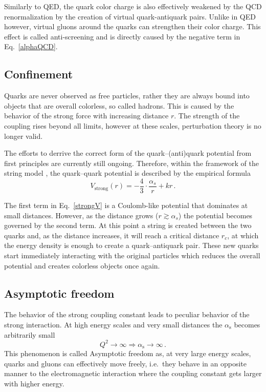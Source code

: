 Similarly to QED, the quark color charge is also effectively weakened by the QCD renormalization by the creation of virtual quark-antiquark pairs. Unlike in QED however, virtual gluons around the quarks can strengthen their color charge. This effect is called anti-screening and is directly caused by the negative term in Eq.\ \eqref{alphaQCD}\@.






\subsection{Confinement}

Quarks are never observed as free particles, rather they are always bound into objects that are overall colorless, so called hadrons. This is caused by the behavior of the strong force with increasing distance $r$\@. The strength of the coupling rises beyond all limits, however at these scales, perturbation theory is no longer valid.

The efforts to derrive the correct form of the quark--(anti)quark potential from first principles are currently still ongoing. Therefore, within the framework of the string model \cite{string}, the quark--quark potential is described by the empirical formula
\begin{equation} \label{strongV}
 V_\mathrm{strong} (r) = - \frac{4}{3} \cdot \frac{\alpha_s}{r} + kr\,.
\end{equation}

The first term in Eq.\ \eqref{strongV} is a Coulomb-like potential that dominates at small distances. However, as the distance grows ($r \gtrsim \alpha_s$) the potential becomes governed by the second term.  At this point a string is created between the two quarks and, as the distance increases, it will reach a critical distance $r_c$, at which the energy density is enough to create a quark--antiquark pair. These new quarks start immediately interacting with the original particles which reduces the overall potential and creates colorless objects once again.

\subsection{Asymptotic freedom}

The behavior of the strong coupling constant leads to peculiar behavior of the strong interaction. At high energy scales and very small distances the $\alpha_\mathrm{s}$ becomes arbitrarily small
\begin{equation}
 Q^2 \rightarrow \infty \Rightarrow \alpha_\mathrm{s} \rightarrow \infty\,.
\end{equation}
This phenomenon is called Asymptotic freedom as, at very large energy scales, quarks and gluons can effectively move freely, i.e.\ they behave in an opposite manner to the electromagnetic interaction where the coupling constant gets larger with higher energy.

